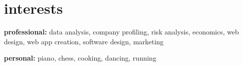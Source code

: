 \section{interests}

\textbf{professional:} data analysis, company profiling, risk analysis, economics, web design, web app creation, software design, marketing

\textbf{personal:} piano, chess, cooking, dancing, running
